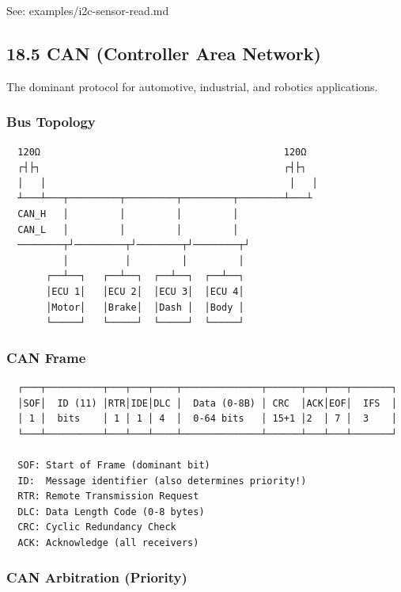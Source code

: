\documentclass[11pt,a4paper]{book}
\begin{document}
\begin{itemize}
See: examples/i2c-sensor-read.md

\medskip\noindent\hrulefill\medskip

\subsection{18.5 CAN (Controller Area Network)}

The dominant protocol for automotive, industrial, and robotics applications.

\subsubsection{Bus Topology}

\begin{lstlisting}
  120Ω                                           120Ω
  ┌┤├┐                                           ┌┤├┐
  │   │                                           │   │
  ┴───┴───┬─────────┬─────────┬─────────┬────────┴───┴
  CAN_H   │         │         │         │
  CAN_L   │         │         │         │
  ────────┬┘─────────┬┘────────┬┘────────┬┘
          │          │         │         │
       ┌──┴──┐   ┌──┴──┐  ┌──┴──┐  ┌──┴──┐
       │ECU 1│   │ECU 2│  │ECU 3│  │ECU 4│
       │Motor│   │Brake│  │Dash │  │Body │
       └─────┘   └─────┘  └─────┘  └─────┘
\end{lstlisting}

\subsubsection{CAN Frame}

\begin{lstlisting}
  ┌───┬──────────┬───┬───┬────┬──────────────┬──────┬───┬───┬───────┐
  │SOF│  ID (11) │RTR│IDE│DLC │  Data (0-8B) │ CRC  │ACK│EOF│  IFS  │
  │ 1 │  bits    │ 1 │ 1 │ 4  │  0-64 bits   │ 15+1 │2  │ 7 │  3    │
  └───┴──────────┴───┴───┴────┴──────────────┴──────┴───┴───┴───────┘
  
  SOF: Start of Frame (dominant bit)
  ID:  Message identifier (also determines priority!)
  RTR: Remote Transmission Request
  DLC: Data Length Code (0-8 bytes)
  CRC: Cyclic Redundancy Check
  ACK: Acknowledge (all receivers)
\end{lstlisting}

\subsubsection{CAN Arbitration (Priority)}


\end{itemize}
\end{document}
